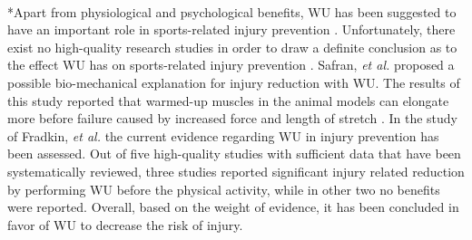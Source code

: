 \\*Apart from physiological and psychological benefits, WU has been suggested to have an important role in sports-related injury prevention \cite{shellock1985warming}. Unfortunately, there exist no high-quality research studies in order to draw a definite conclusion as to the effect WU has on sports-related injury prevention \cite{fields2007should}. Safran, \textit{et al.} proposed a possible bio-mechanical explanation for injury reduction with WU. The results of this study reported that warmed-up muscles in the animal models can elongate more before failure caused by increased force and length of stretch \cite{safran1989warm}. In the study of Fradkin, \textit{et al.} the current evidence regarding WU in injury prevention has been assessed. Out of five high-quality studies with sufficient data that have been systematically reviewed, three studies reported significant injury related reduction by performing WU before the physical activity, while in other two no benefits were reported. Overall, based on the weight of evidence, it has been concluded in favor of WU to decrease the risk of injury.\\
